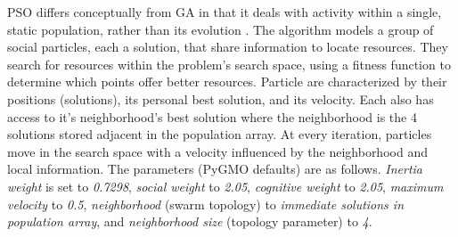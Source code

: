 \documentclass{tamuccthesis}
\begin{document}
PSO differs conceptually from GA in that it deals with activity within a single, static population, rather than its evolution \cite{pso:nie:2016}. The algorithm models a group of social particles, each a solution, that share information to locate resources. They search for resources within the problem's search space, using a fitness function to determine which points offer better resources. Particle are characterized by their positions (solutions), its personal best solution, and its velocity. Each also has access to it's neighborhood's best solution where the neighborhood is the 4 solutions stored adjacent in the population array. At every iteration, particles move in the search space with a velocity influenced by the neighborhood and local information. The parameters (PyGMO defaults) are as follows. \textit{Inertia weight} is set to \textit{0.7298}, \textit{social weight} to \textit{2.05}, \textit{cognitive weight} to \textit{2.05}, \textit{maximum velocity} to \textit{0.5}, \textit{neighborhood} (swarm topology) to \textit{immediate solutions in population array}, and \textit{neighborhood size} (topology parameter) to \textit{4}. 

\end{document}
